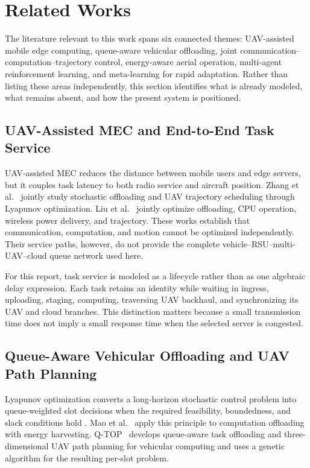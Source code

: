 \documentclass[journal]{IEEEtran}
\begin{document}
\section{Related Works}
\label{related_works}
The literature relevant to this work spans six connected themes:
UAV-assisted mobile edge computing, queue-aware vehicular
offloading, joint communication--computation--trajectory control,
energy-aware aerial operation, multi-agent reinforcement learning,
and meta-learning for rapid adaptation.  Rather than listing these
areas independently, this section identifies what is already modeled,
what remains absent, and how the present system is positioned.

\subsection{UAV-Assisted MEC and End-to-End Task Service}
UAV-assisted MEC reduces the distance between mobile users and edge
servers, but it couples task latency to both radio service and aircraft
position.  Zhang et al.~\cite{zhang2019mobile} jointly study stochastic
offloading and UAV trajectory scheduling through Lyapunov
optimization.  Liu et al.~\cite{liu2020uav} jointly optimize
offloading, CPU operation, wireless power delivery, and trajectory.
These works establish that communication, computation, and motion
cannot be optimized independently.  Their service paths, however, do
not provide the complete vehicle--RSU--multi-UAV--cloud queue network
used here.

For this report, task service is modeled as a lifecycle rather than as
one algebraic delay expression.  Each task retains an identity while
waiting in ingress, uploading, staging, computing, traversing UAV
backhaul, and synchronizing its UAV and cloud branches.  This
distinction matters because a small transmission time does not imply a
small response time when the selected server is congested.

\subsection{Queue-Aware Vehicular Offloading and UAV Path Planning}
Lyapunov optimization converts a long-horizon stochastic control
problem into queue-weighted slot decisions when the required
feasibility, boundedness, and slack conditions hold
\cite{neely2010stochastic}.  Mao et al.~\cite{mao2017dynamic} apply
this principle to computation offloading with energy harvesting.
Q-TOP~\cite{sun2026qtop} develops queue-aware task offloading and
three-dimensional UAV path planning for vehicular computing and uses
a genetic algorithm for the resulting per-slot problem.
\end{document}
